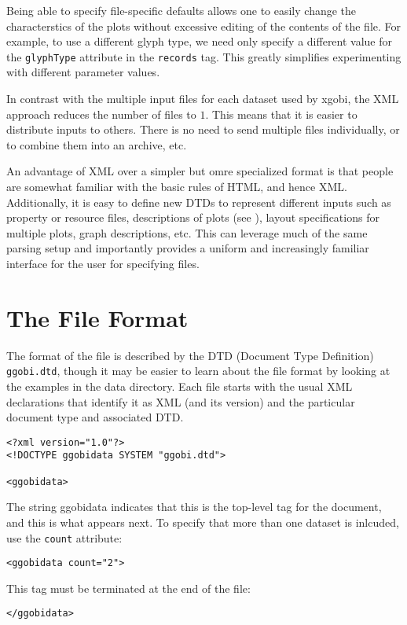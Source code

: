 \documentclass{article}
\begin{document}
Being able to specify file-specific defaults allows one to easily
change the characterstics of the plots without excessive editing of
the contents of the file.  For example, to use a different glyph type,
we need only specify a different value for the \texttt{glyphType}
attribute in the \texttt{records} tag.  This greatly simplifies
experimenting with different parameter values.


In contrast with the multiple input files for each dataset used by
xgobi, the XML approach reduces the number of files to $1$. This means
that it is easier to distribute inputs to others. There is no need to
send multiple files individually, or to combine them into an archive,
etc.

An advantage of XML over a simpler but omre specialized format is that
people are somewhat familiar with the basic rules of HTML, and hence
XML. Additionally, it is easy to define new DTDs to represent
different inputs such as property or resource files, descriptions of
plots (see ), layout specifications for multiple plots,
graph descriptions, etc.  This can leverage much of the same parsing
setup and importantly provides a uniform and increasingly familiar
interface for the user for specifying files.


\section{The File Format}

The format of the file is described by the DTD (Document Type
Definition) \texttt{ggobi.dtd}, though it may be easier to learn about
the file format by looking at the examples in the data directory.
Each file starts with the usual XML declarations that identify it as
XML (and its version) and the particular document type and associated
DTD.


\begin{verbatim}
<?xml version="1.0"?>
<!DOCTYPE ggobidata SYSTEM "ggobi.dtd">

<ggobidata>
\end{verbatim}
%
The string ggobidata indicates that this is the top-level tag for the
document, and this is what appears next.  To specify that more than
one dataset is inlcuded, use the \texttt{count} attribute:
%
\begin{verbatim}
<ggobidata count="2">
\end{verbatim}
%
This tag must be terminated at the end of the file:
\begin{verbatim}
</ggobidata>
\end{verbatim}
\end{document}
